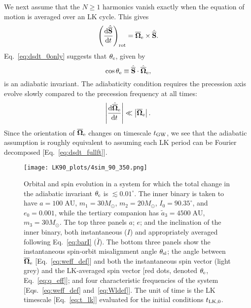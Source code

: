 \documentclass[
        twocolumn,
        twocolappendix
    ]{aastex63}
\newcommand*{\rd}[2]{\frac{\mathrm{d}#1}{\mathrm{d}#2}}
\newcommand*{\abs}[1]{\left|#1\right|}
\renewcommand*{\bm}[1]{\boldsymbol{\mathbf{#1}}}
\newcommand*{\uv}[1]{\hat{\bm{#1}}}
\newcommand*{\p}[1]{\left(#1\right)}
\begin{document}
We next assume that the $N \geq 1$ harmonics vanish exactly when the equation of
motion is averaged over an LK cycle. This gives
\begin{equation}
    \p{\rd{\uv{\overline{S}}}{t}}_{\rm rot}
        = \bm{\overline{\Omega}}_{\rm e}
            \times \uv{\overline{S}}.\label{eq:dsdt_0only}
\end{equation}
Eq.~\eqref{eq:dsdt_0only} suggests that $\theta_{\rm e}$, given by
\begin{equation}
    \cos \theta_{\rm e} \equiv
        \uv{\overline{S}} \cdot \uv{\overline{\Omega}}_{\rm e},
        \label{eq:q_eff}
\end{equation}
is an adiabatic invariant. The adiabaticity condition requires the precession
axis evolve slowly compared to the precession frequency at all times:
\begin{equation}
    \abs{\rd{\uv{\overline{\Omega}}_{\rm e}}{t}} \ll
        \abs{\bm{\overline{\Omega}}_{\rm e}}. \label{eq:ad_constr}
\end{equation}
Since the orientation of $\bm{\overline{\Omega}}_{\rm e}$ changes on timescale
$t_{\rm GW}$, we see that the adiabatic assumption is roughly equivalent to
assuming each LK period can be Fourier decomposed [Eq.~\eqref{eq:dsdt_fullft}].

\begin{figure*}
    \centering
    \texttt{[image: LK90\_plots/4sim\_90\_350.png]}
    \caption{Orbital and spin evolution in a system for which the total change
    in the adiabatic invariant $\theta_{\rm e}$ is $\lesssim 0.01^\circ$. The
    inner binary is taken to have $a = 100\;\mathrm{AU}$, $m_1 = 30M_{\odot}$,
    $m_2 = 20M_{\odot}$, $I_0 = 90.35^\circ$, and $e_0 = 0.001$, while the
    tertiary companion has $\tilde{a}_3 = 4500\;\mathrm{AU}$, $m_3 =
    30M_{\odot}$. The top three panels $a$; $e$; and the inclination of the
    inner binary, both instantaneous ($I$) and appropriately averaged following
    Eq.~\eqref{eq:barI} ($\bar{I}$). The bottom three panels show the
    instantaneous spin-orbit misalignment angle $\theta_{\rm sl}$; the angle
    between $\overline{\bm{\Omega}}_{\rm e}$ [Eq.~\eqref{eq:weff_def}] and both
    the instantaneous spin vector (light grey) and the LK-averaged spin vector
    [red dots, denoted $\theta_{\rm e}$, Eq.~\eqref{eq:q_eff}]; and four
    characteristic frequencies of the system [Eqs.~\ref{eq:weff_def}
    and~\eqref{eq:Wldef}]. The unit of time is the LK timescale
    [Eq.~\eqref{eq:t_lk}] evaluated for the initial conditions $t_{\rm LK,
    0}$.}\label{fig:4sim_90_350}
\end{figure*}
\end{document}
